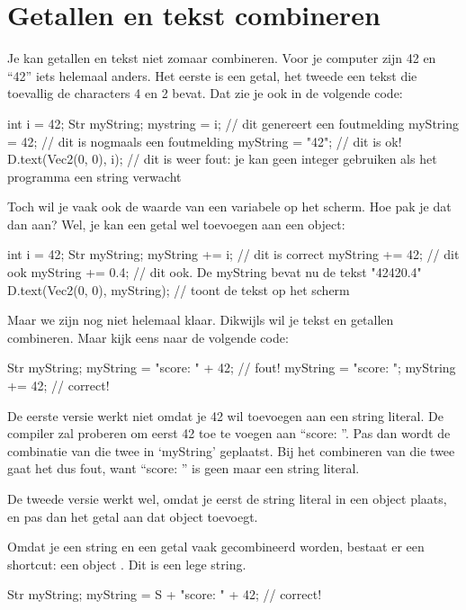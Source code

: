 \section{Getallen en tekst combineren}
Je kan getallen en tekst niet zomaar combineren. Voor je computer zijn 42 en ``42'' iets helemaal anders. Het eerste is een getal, het tweede een tekst die toevallig de characters 4 en 2 bevat. Dat zie je ook in de volgende code:

\begin{code}
int i = 42;
Str myString;
mystring = i; // dit genereert een foutmelding
myString = 42; // dit is nogmaals een foutmelding
myString = "42"; // dit is ok!
D.text(Vec2(0, 0), i); // dit is weer fout: je kan geen integer gebruiken als het programma een string verwacht
\end{code}

Toch wil je vaak ook de waarde van een variabele op het scherm. Hoe pak je dat dan aan? Wel, je kan een getal wel toevoegen aan een  object:

\begin{code}
int i = 42;
Str myString;
myString += i; // dit is correct
myString += 42; // dit ook
myString += 0.4; // dit ook. De myString bevat nu de tekst "42420.4"
D.text(Vec2(0, 0), myString); // toont de tekst op het scherm
\end{code}

Maar we zijn nog niet helemaal klaar. Dikwijls wil je tekst en getallen combineren. Maar kijk eens naar de volgende code:

\begin{code}
Str myString;
myString = "score: " + 42; // fout!
myString = "score: ";
myString += 42; // correct!
\end{code}
 
De eerste versie werkt niet omdat je 42 wil toevoegen aan een string literal. De compiler zal proberen om eerst 42 toe te voegen aan ``score: ''. Pas dan wordt de combinatie van die twee in `myString' geplaatst. Bij het combineren van die twee gaat het dus fout, want ``score: '' is geen  maar een string literal.

De tweede versie werkt wel, omdat je eerst de string literal in een  object plaats, en pas dan het getal aan dat object toevoegt.

Omdat je een string en een getal vaak gecombineerd worden, bestaat er een shortcut: een  object . Dit is een lege string.

\begin{code}
Str myString;
myString = S + "score: " + 42; // correct!
\end{code}

